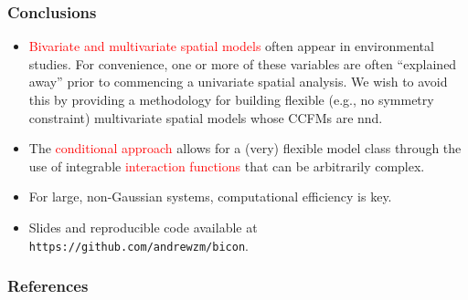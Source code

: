 \documentclass{beamer}
\begin{document}
\begin{frame}
\frametitle{Conclusions}

\begin{itemize}
\item \textcolor{red}{Bivariate and multivariate spatial models} often appear in environmental studies. For convenience, one or more of these variables are often ``explained away'' prior to commencing a univariate spatial analysis. We wish to avoid this by providing a methodology for building flexible (e.g., no symmetry constraint) multivariate spatial models whose CCFMs are nnd.
\item The \textcolor{red}{conditional approach} allows for a (very) flexible model class through the use of integrable \textcolor{red}{interaction functions} that can be arbitrarily complex.
\item For large, non-Gaussian systems, computational efficiency is key.
\item Slides and reproducible code available at \texttt{https://github.com/andrewzm/bicon}.
\end{itemize}
\end{frame}

\small

\begin{frame}%
\frametitle{References}


\vspace{-1cm}
\scriptsize{
}


\end{frame}
\end{document}
